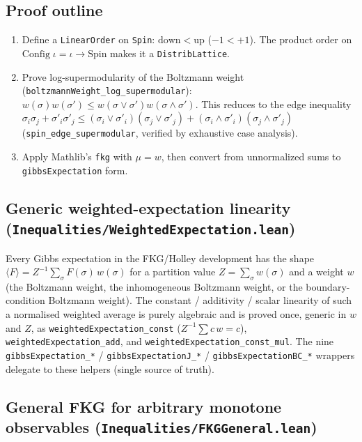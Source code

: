 \documentclass[a4paper,11pt]{article}
\begin{document}
\subsection{Proof outline}
\begin{enumerate}
\item Define a \texttt{LinearOrder} on \texttt{Spin}: $\mathrm{down} < \mathrm{up}$
  ($-1 < +1$). The product order on $\mathrm{Config}\;\iota = \iota \to
  \mathrm{Spin}$ makes it a \texttt{DistribLattice}.
\item Prove log-supermodularity of the Boltzmann weight
  (\texttt{boltzmannWeight\_log\_supermodular}):
  $w(\sigma)w(\sigma') \leq w(\sigma \vee \sigma')w(\sigma \wedge \sigma')$.
  This reduces to the edge inequality
  $\sigma_i\sigma_j + \sigma'_i\sigma'_j \leq
  (\sigma_i \vee \sigma'_i)(\sigma_j \vee \sigma'_j) +
  (\sigma_i \wedge \sigma'_i)(\sigma_j \wedge \sigma'_j)$
  (\texttt{spin\_edge\_supermodular}, verified by exhaustive case analysis).
\item Apply Mathlib's \texttt{fkg} with $\mu = w$, then convert from
  unnormalized sums to \texttt{gibbsExpectation} form.
\end{enumerate}

\subsection{Generic weighted-expectation linearity
(\texttt{Inequalities/WeightedExpectation.lean})}

Every Gibbs expectation in the FKG/Holley development has the shape
$\langle F \rangle = Z^{-1} \sum_\sigma F(\sigma)\, w(\sigma)$ for a partition
value $Z = \sum_\sigma w(\sigma)$ and a weight $w$ (the Boltzmann weight, the
inhomogeneous Boltzmann weight, or the boundary-condition Boltzmann weight). The
constant / additivity / scalar linearity of such a normalised weighted average is
purely algebraic and is proved once, generic in $w$ and $Z$, as
\texttt{weightedExpectation\_const} ($Z^{-1}\sum c\,w = c$),
\texttt{weightedExpectation\_add}, and \texttt{weightedExpectation\_const\_mul}.
The nine \texttt{gibbsExpectation\_*} / \texttt{gibbsExpectationJ\_*} /
\texttt{gibbsExpectationBC\_*} wrappers delegate to these helpers (single source of
truth).

\subsection{General FKG for arbitrary monotone observables
(\texttt{Inequalities/FKGGeneral.lean})}
\end{document}
